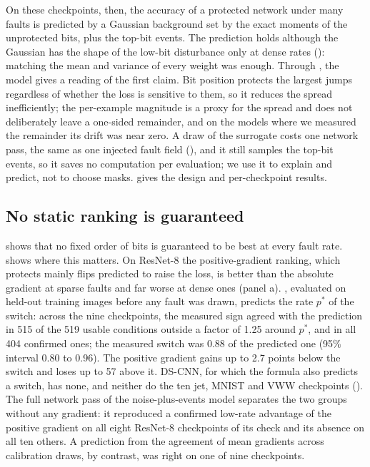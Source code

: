 On these checkpoints, then, the accuracy of a protected network under many faults is predicted by a Gaussian background set by the exact moments of the unprotected bits, plus the top-bit events. The prediction holds although the Gaussian has the shape of the low-bit disturbance only at dense rates (): matching the mean and variance of every weight was enough. Through , the model gives a reading of the first claim. Bit position protects the largest jumps regardless of whether the loss is sensitive to them, so it reduces the spread inefficiently; the per-example magnitude is a proxy for the spread and does not deliberately leave a one-sided remainder, and on the models where we measured the remainder its drift was near zero. A draw of the surrogate costs one network pass, the same as one injected fault field (), and it still samples the top-bit events, so it saves no computation per evaluation; we use it to explain and predict, not to choose masks.  gives the design and per-checkpoint results.

\subsection{No static ranking is guaranteed}\label{sec:reversals}\label{sec:harm}
 shows that no fixed order of bits is guaranteed to be best at every fault rate.  shows where this matters. On ResNet-8 the positive-gradient ranking, which protects mainly flips predicted to raise the loss, is better than the absolute gradient at sparse faults and far worse at dense ones (panel a). , evaluated on held-out training images before any fault was drawn, predicts the rate $p^*$ of the switch: across the nine checkpoints, the measured sign agreed with the prediction in 515 of the 519 usable conditions outside a factor of 1.25 around $p^*$, and in all 404 confirmed ones; the measured switch was 0.88 of the predicted one (95\% interval 0.80 to 0.96). The positive gradient gains up to 2.7 points below the switch and loses up to 57 above it. DS-CNN, for which the formula also predicts a switch, has none, and neither do the ten jet, MNIST and VWW checkpoints (). The full network pass of the noise-plus-events model separates the two groups without any gradient: it reproduced a confirmed low-rate advantage of the positive gradient on all eight ResNet-8 checkpoints of its check and its absence on all ten others. A prediction from the agreement of mean gradients across calibration draws, by contrast, was right on one of nine checkpoints.

